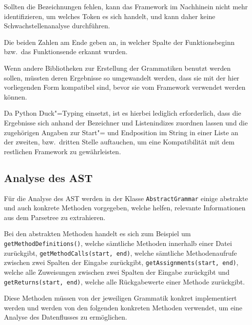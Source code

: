             Sollten die Bezeichnungen fehlen,
            kann das Framework im Nachhinein nicht mehr identifizieren,
            um welches Token es sich handelt,
            und
            kann daher keine Schwachstellenanalyse durchführen.

            Die beiden Zahlen am Ende geben an,
            in welcher Spalte der Funktionsbeginn bzw.\ das Funktionsende erkannt wurden.

            Wenn andere Bibliotheken zur Erstellung der Grammatiken benutzt werden sollen,
            müssten deren Ergebnisse so umgewandelt werden,
            dass sie mit der hier vorliegenden Form kompatibel sind,
            bevor sie vom Framework verwendet werden können.

            Da Python Duck"=Typing einsetzt,
            ist es hierbei lediglich erforderlich,
            dass die Ergebnisse sich anhand der Bezeichner und
            Listenindizes zuordnen lassen und
            die zugehörigen Angaben zur Start"= und
            Endposition im String in einer Liste an der zweiten,
            bzw.\ dritten Stelle auftauchen,
            um eine Kompatibilität mit dem restlichen Framework zu gewährleisten.

        \subsection{Analyse des AST}
            Für die Analyse des
            \gls{AST} werden in der Klasse
            \lstinline{AbstractGrammar} einige abstrakte und
            auch konkrete Methoden vorgegeben,
            welche helfen,
            relevante Informationen aus dem Parsetree zu extrahieren.

            Bei den abstrakten Methoden handelt es sich zum Beispiel um
            \lstinline{getMethodDefinitions()},
            welche sämtliche Methoden innerhalb einer Datei zurückgibt,
            \lstinline{getMethodCalls(start, end)},
            welche sämtliche Methodenaufrufe zwischen zwei Spalten der Eingabe zurückgibt,
            \lstinline{getAssignments(start, end)},
            welche alle Zuweisungen zwischen zwei Spalten der Eingabe zurückgibt und
            \lstinline{getReturns(start, end)},
            welche alle Rückgabewerte einer Methode zurückgibt.

            Diese Methoden müssen von der jeweiligen Grammatik konkret implementiert werden und
            werden von den folgenden konkreten Methoden verwendet,
            um eine Analyse des Datenflusses zu ermöglichen.

